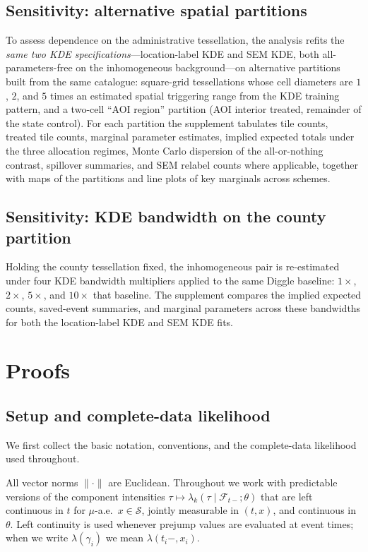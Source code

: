 \documentclass{statsoc}
\newcommand{\1}{\mathbbm{1}}
\begin{document}
\subsection{Sensitivity: alternative spatial partitions}\label{sec:ok_partition_sens}
To assess dependence on the administrative tessellation, the analysis refits the \emph{same two KDE specifications}---location-label KDE and SEM KDE, both all-parameters-free on the inhomogeneous background---on alternative partitions built from the same catalogue: square-grid tessellations whose cell diameters are $1$, $2$, and $5$ times an estimated spatial triggering range from the KDE training pattern, and a two-cell ``AOI region'' partition (AOI interior treated, remainder of the state control). For each partition the supplement tabulates tile counts, treated tile counts, marginal parameter estimates, implied expected totals under the three allocation regimes, Monte Carlo dispersion of the all-or-nothing contrast, spillover summaries, and SEM relabel counts where applicable, together with maps of the partitions and line plots of key marginals across schemes.

\subsection{Sensitivity: KDE bandwidth on the county partition}\label{sec:ok_bw_sens}
Holding the county tessellation fixed, the inhomogeneous pair is re-estimated under four KDE bandwidth multipliers applied to the same Diggle baseline: $1\times$, $2\times$, $5\times$, and $10\times$ that baseline. The supplement compares the implied expected counts, saved-event summaries, and marginal parameters across these bandwidths for both the location-label KDE and SEM KDE fits.

\section{Proofs}
\subsection{Setup and complete-data likelihood}\label{sec:setup}

We first collect the basic notation, conventions, and the complete-data likelihood used throughout.

All vector norms $\|\cdot\|$ are Euclidean. Throughout we work with predictable versions of the component intensities $\tau\mapsto \lambda_k(\tau\mid \mathcal F_{t-};\theta)$ that are left continuous in $t$ for $\mu$-a.e.\ $x\in\mathcal S$, jointly measurable in $(t,x)$, and continuous in $\theta$. Left continuity is used whenever pre\-jump values are evaluated at event times; when we write $\lambda(\gamma_i)$ we mean $\lambda(t_i-,x_i)$.
\end{document}
